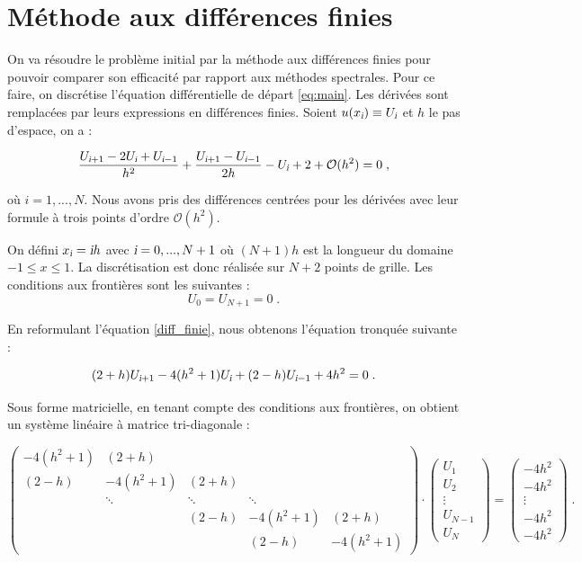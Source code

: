 \documentclass{report}
\begin{document}
\section{Méthode aux différences finies}

On va résoudre le problème initial par la méthode aux différences finies pour pouvoir comparer son efficacité par rapport aux méthodes spectrales. Pour ce faire, on discrétise l'équation différentielle de départ \eqref{eq:main}. Les dérivées sont remplacées par leurs expressions en différences finies. Soient $u(x_{\textsl{i}}) \equiv U_{\textsl{i}}$ et $h$ le pas d'espace, on a :

\begin{equation}
\frac{U_{\textsl{i}+1} - 2 U_{\textsl{i}} + U_{\textsl{i}-1}}{h^2} + \frac{U_{\textsl{i}+1} - U_{\textsl{i}-1}}{2h} - U_{\textsl{i}} +2 + \mathcal{O}(h^2) = 0\;,\label{diff_finie}
\end{equation}

où $i = 1,...,N$. Nous avons pris des différences centrées pour les dérivées avec leur formule à trois points d'ordre $\mathcal{O}(h^2)$. 

On défini $x_{\textsl{i}}=\textsl{i}h$ avec $\textsl{i} = 0,...,N+1$ où $(N+1)h$ est la longueur du domaine $-1\leq x \leq 1$. La discrétisation est donc réalisée sur $N+2$ points de grille. Les conditions aux frontières sont les suivantes :
\begin{equation}
U_{0}=U_{N+1}=0\;.
\end{equation}

En reformulant l'équation \eqref{diff_finie}, nous obtenons l'équation tronquée suivante :

\begin{equation}
(2+h)U_{\textsl{i}+1}-4(h^2+1)U_{\textsl{i}}+(2-h)U_{\textsl{i}-1}+4h^2=0\;.
\end{equation}

Sous forme matricielle, en tenant compte des conditions aux frontières, on obtient un système linéaire à matrice tri-diagonale :

\begin{equation}
\begin{pmatrix}
-4(h^2+1) & (2+h) &  &  & \\ 
 (2-h) & -4(h^2+1) & (2+h) &  & \\ 
 & \ddots & \ddots & \ddots & \\ 
 &  & (2-h) & -4(h^2+1) & (2+h)\\ 
 &  &  & (2-h) & -4(h^2+1)
\end{pmatrix} \cdot \begin{pmatrix}
 U_{1}\\ 
 U_{2}\\ 
 \vdots\\ 
 U_{N-1}\\ 
 U_{N}
\end{pmatrix} =
\begin{pmatrix}
 -4h^2\\ 
 -4h^2\\ 
 \vdots\\ 
 -4h^2\\ 
 -4h^2
\end{pmatrix}\;.
\end{equation}
\end{document}
